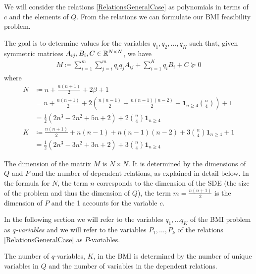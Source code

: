 \documentclass[a4paper,12pt,twoside,BCOR=10mm]{scrbook}
\begin{document}
We will consider the relations \eqref{RelationsGeneralCase} as polynomials in terms of $c$ and the elements of $Q$. From the relations we can formulate our BMI feasibility problem.

The goal is to determine values for the variables $q_1, q_2, \ldots, q_K$ such that, given symmetric matrices $A_{ij}, B_i, C \in \mathbb{R}^{N\times N}$, we have
\begin{align}\label{BMIgeneralNotDefinition}
    M \coloneqq \sum_{i = 1}^m \sum_{j = i}^m q_iq_jA_{ij} + \sum_{i = 1}^Kq_iB_i + C \succeq 0
\end{align}
where
\begin{align*}
    N &\coloneqq n + \frac{n(n+1)}{2} + 2\beta + 1\\
    &= n + \frac{n(n+1)}{2} + 2\left(\frac{n(n-1)}{2}+ \frac{n(n-1)(n-2)}{2} + \mathbf{1}_{n\geq4}\binom{n}{4}\right) + 1\\
    &= \frac{1}{2}(2n^3 - 2n^2 + 5n + 2) + 2\binom{n}{4}\mathbf{1}_{n\geq4}\\
    K &\coloneqq \frac{n(n+1)}{2} + n(n-1) + n(n-1)(n-2) + 3\binom{n}{4}\mathbf{1}_{n\geq 4} + 1\\
    &= \frac{1}{2}(2n^3 - 3n^2 + 3n + 2) + 3\binom{n}{4}\mathbf{1}_{n\geq4}
\end{align*}

The dimension of the matrix $M$ is $N\times N$. It is determined by the dimensions of $Q$ and $P$ and the number of dependent relations, as explained in detail below. In the formula for $N$, the term $n$ corresponds to the dimension of the SDE (the size of the problem and thus the dimension of $Q$), the term $m = \frac{n(n + 1)}{2}$ is the dimension of $P$ and the 1 accounts for the variable $c$.

In the following section we will refer to the variables $q_1, \ldots q_K$ of the BMI problem as $q$\textit{-variables} and we will refer to the variables $P_1, \ldots, P_k$ of the relations \eqref{RelationsGeneralCase} as $P$-variables.

The number of $q$-variables, $K$, in the BMI is determined by the number of unique variables in $Q$ and the number of variables in the dependent relations.
\end{document}
